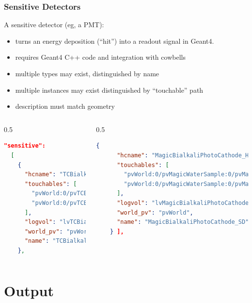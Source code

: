 \documentclass[xcolor=dvipsnames]{beamer}
\begin{document}
\begin{frame}[fragile]
  \frametitle{Sensitive Detectors}
  A sensitive detector (eg, a PMT):
  \begin{itemize}
  \item turns an energy deposition (``hit'') into a readout signal in Geant4.
  \item requires Geant4 C++ code and integration with cowbells
  \item multiple types may exist, distinguished by name
  \item multiple instances may exist distinguished by ``touchable'' path
  \item description must match geometry
  \end{itemize}

  \begin{columns}
    \begin{column}{0.5\linewidth}
  \begin{lstlisting}[language=json, basicstyle=\tiny\ttfamily]
  "sensitive": 
  [ 
    {
      "hcname": "TCBialkaliPhotoCathode_HC", 
      "touchables": [
        "pvWorld:0/pvTCBialkaliPhotoCathode:1", 
        "pvWorld:0/pvTCBialkaliPhotoCathode:2"
      ], 
      "logvol": "lvTCBialkaliPhotoCathode", 
      "world_pv": "pvWorld", 
      "name": "TCBialkaliPhotoCathode_SD"
    }, 
  \end{lstlisting}
    \end{column}
    \begin{column}{0.5\linewidth}
  \begin{lstlisting}[language=json, basicstyle=\tiny\ttfamily]
    { 
      "hcname": "MagicBialkaliPhotoCathode_HC", 
      "touchables": [
        "pvWorld:0/pvMagicWaterSample:0/pvMagicWindowA:0/pvMagicBialkaliPhotoCathode:0", 
        "pvWorld:0/pvMagicWaterSample:0/pvMagicWindowB:0/pvMagicBialkaliPhotoCathode:0"
      ], 
      "logvol": "lvMagicBialkaliPhotoCathode", 
      "world_pv": "pvWorld", 
      "name": "MagicBialkaliPhotoCathode_SD"
    } ], 
  \end{lstlisting}
      
    \end{column}
  \end{columns}

\end{frame}

\section{Output}
\end{document}
